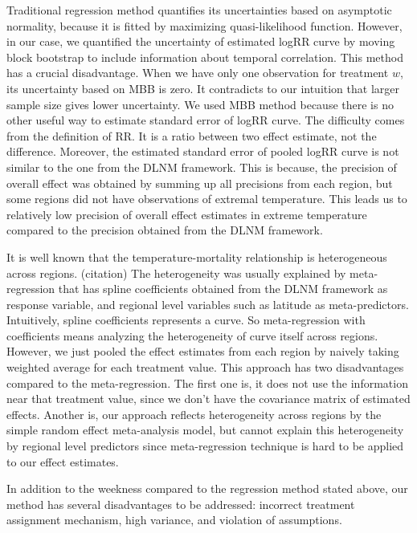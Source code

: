 \documentclass[12pt]{article}
\begin{document}
Traditional regression method quantifies its uncertainties based on asymptotic normality,
because it is fitted by maximizing quasi-likelihood function.
However, in our case, we quantified the uncertainty of estimated logRR curve by moving block bootstrap
to include information about temporal correlation.
This method has a crucial disadvantage.
When we have only one observation for treatment $w$, its uncertainty based on MBB is zero.
It contradicts to our intuition that larger sample size gives lower uncertainty.
We used MBB method because there is no other useful way to estimate standard error of logRR curve.
The difficulty comes from the definition of RR.
It is a ratio between two effect estimate, not the difference.
Moreover, the estimated standard error of pooled logRR curve is not similar to the one from the DLNM framework.
This is because,
the precision of overall effect was obtained by summing up all precisions from each region,
but some regions did not have observations of extremal temperature.
This leads us to relatively low precision of overall effect estimates in extreme temperature
compared to the precision obtained from the DLNM framework.

It is well known that the temperature-mortality relationship is heterogeneous across regions. (citation)
The heterogeneity was usually explained by meta-regression
that has spline coefficients obtained from the DLNM framework as response variable, 
and regional level variables such as latitude as meta-predictors.
Intuitively, spline coefficients represents a curve.
So meta-regression with coefficients means analyzing the heterogeneity of curve itself across regions.
However, we just pooled the effect estimates from each region 
by naively taking weighted average for each treatment value.
This approach has two disadvantages compared to the meta-regression.
The first one is, it does not use the information near that treatment value,
since we don't have the covariance matrix of estimated effects.
Another is, our approach reflects heterogeneity across regions by the simple random effect meta-analysis model, 
but cannot explain this heterogeneity by regional level predictors
since meta-regression technique is hard to be applied to our effect estimates.

In addition to the weekness compared to the regression method stated above,
our method has several disadvantages to be addressed:
incorrect treatment assignment mechanism, high variance, and violation of assumptions.
\end{document}
